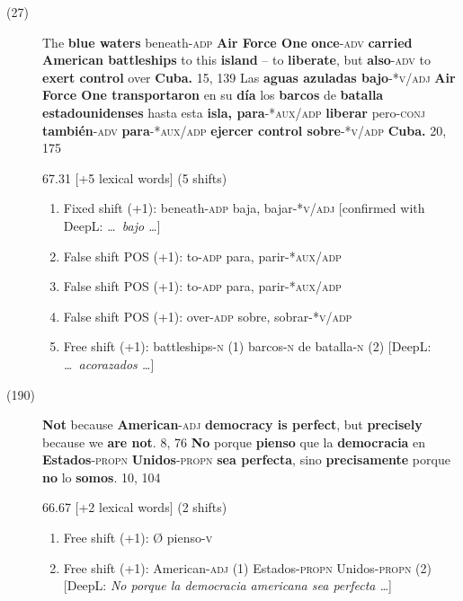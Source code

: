 \documentclass[output=paper]{langsci/langscibook}
\begin{document}
\begin{description}
  \item[(27)] The \textbf{blue waters} beneath-\textsc{adp} \textbf{Air Force One} \textbf{once}\textsc{-adv} \textbf{carried American battleships} to this \textbf{island} -- to \textbf{liberate}, but \textbf{also}\textsc{-adv} to \textbf{exert control} over \textbf{Cuba.} 15, 139 \rightarrow Las \textbf{aguas azuladas bajo}\textsc{-*v/adj} \textbf{Air Force One transportaron} en su \textbf{día} los \textbf{barcos} de \textbf{batalla estadounidenses} hasta esta \textbf{isla, para}\textsc{-*aux/adp} \textbf{liberar} pero\textsc{-conj} \textbf{también}\textsc{-adv} \textbf{para}\textsc{-*aux/adp} \textbf{ejercer control sobre}\textsc{-*v/adp}\textbf{ Cuba.} 20, 175

    67.31 [+5 lexical words] (5 shifts)

    \begin{enumerate}
      \item Fixed shift (+1): beneath-\textsc{adp} \rightarrow baja, bajar-*\textsc{v/adj }[confirmed with DeepL: \textit{\dots\ bajo \dots}]
      \item False shift POS (+1): to-\textsc{adp} \rightarrow para, parir-*\textsc{aux/adp}
      \item False shift POS (+1): to-\textsc{adp} \rightarrow para, parir-*\textsc{aux/adp}
      \item False shift POS (+1): over-\textsc{adp} \rightarrow sobre, sobrar-*\textsc{v/adp}
      \item Free shift (+1): battleships-\textsc{n} (1) \rightarrow barcos-\textsc{n} de batalla-\textsc{n} (2) [DeepL: \textit{\dots\ acorazados \dots}]
    \end{enumerate}

  \item[(190)] \textbf{Not} because \textbf{American}\textsc{-adj} \textbf{democracy is perfect}, but \textbf{precisely} because we \textbf{are not}. 8, 76 \rightarrow \textbf{No} porque \textbf{pienso} que la \textbf{democracia} en \textbf{Estados}\textsc{-propn}\textbf{ Unidos}\textsc{-propn}\textbf{ sea perfecta}, sino \textbf{precisamente} porque \textbf{no} lo \textbf{somos}. 10, 104

    66.67 [+2 lexical words] (2 shifts)

    \begin{enumerate}
      \item Free shift (+1): Ø \rightarrow pienso-\textsc{v}
      \item Free shift (+1): American-\textsc{adj} (1) \rightarrow Estados\textsc{-propn} Unidos-\textsc{propn} (2) [DeepL: \textit{No porque la democracia americana sea perfecta \dots}]
    \end{enumerate}


\end{description}
\end{document}
